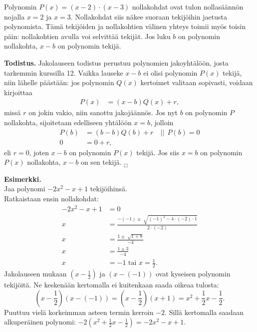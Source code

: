 Polynomin $P(x)=(x-2)\cdot(x-3)$ nollakohdat ovat tulon nollasäännön nojalla $x=2$ ja $x=3$. Nollakohdat siis näkee suoraan tekijöihin jaetusta polynomista. Tämä tekijöiden ja nollakohtien välinen yhteys toimii myös toisin päin: nollakohtien avulla voi selvittää tekijät. Jos luku $b$ on polynomin nollakohta, $x-b$ on polynomin tekijä.



\textbf{Todistus.} Jakolauseen todistus perustuu polynomien jakoyhtälöön, josta tarkemmin kurssilla 12. Vaikka lauseke $x-b$ ei olisi polynomin $P(x)$ tekijä, niin lähelle päästään: jos polynomin $Q(x)$ kertoimet valitaan sopivasti, voidaan kirjoittaa
\begin{align*}
P(x)&=(x-b)Q(x)+r, 
\end{align*}
missä $r$ on jokin vakio, niin sanottu jakojäännös. Jos nyt $b$ on polynomin $P$ nollakohta, sijoitetaan edelliseen yhtälöön $x=b$, jolloin
\begin{align*}
P(b)&=(b-b)Q(b)+r \quad || \ \ P(b)=0 \\
0&=0+r,  
\end{align*}
eli $r=0$, joten $x-b$ on polynomin $P(x)$ tekijä. Jos siis $x=b$ on polynomin $P(x)$ nollakohta, $x-b$ on sen tekijä. $_\Box$

\textbf{Esimerkki.} \\
Jaa polynomi $-2x^2-x+1$ tekijöihinsä.\\
Ratkaistaan ensin nollakohdat:
\begin{align*}
-2x^2-x+1&=0 \\
x&=\frac{-(-1) \pm \sqrt[]{(-1)^2-4 \cdot (-2) \cdot 1}}{2 \cdot (-2)} \\
x&=\frac{1 \pm \sqrt[]{1+8}}{-4} \\
x&=\frac{1 \pm 3}{-4} \\
x&=-1 \textrm{ tai } x = \frac{1}{2}.
\end{align*}
Jakolauseen mukaan $(x-\frac{1}{2})$ ja $(x-(-1))$ ovat kyseisen polynomin tekijöitä.
Ne keskenään kertomalla ei kuitenkaan saada oikeaa tulosta:
$$\left(x-\frac{1}{2}\right)(x-(-1))=\left(x-\frac{1}{2}\right)(x+1)=x^2+\frac{1}{2}x-\frac{1}{2}.$$
Puuttuu vielä korkeimman asteen termin kerroin $-2$. Sillä kertomalla saadaan alkuperäinen polynomi:
$-2(x^2+\frac{1}{2}x-\frac{1}{2})=-2x^2-x+1$.


